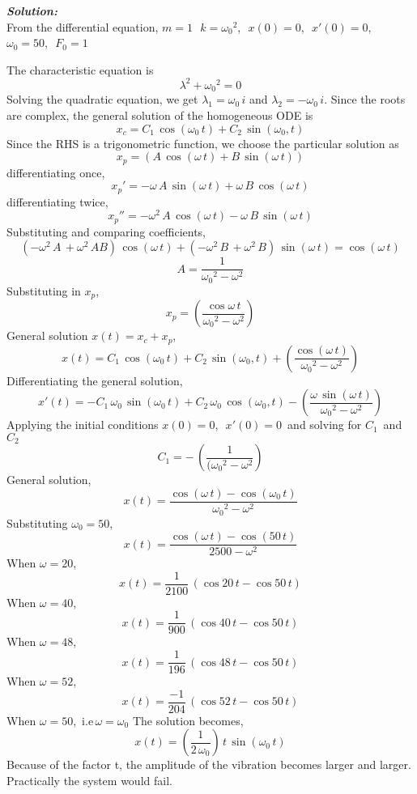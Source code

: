 \documentclass[]{book}
\theoremstyle{definition}
\begin{document}
\begin{enumerate}
\emph{\textbf{Solution:}}\\
From the differential equation,
$m = 1$\,\, $k = {\omega_0}^2$,\,\, ${x}(0) = 0$,\,\, ${x}'(0) = 0$,\,\, $\omega_0 = 50$,\,\, $F_0 = 1$

The characteristic equation is
\[\lambda^2 + {\omega_0}^2 = 0\]
Solving the quadratic equation, we get \(\lambda_1 = {\omega_0}\,i\) and \(\lambda_2 = -{\omega_0}\,i\).
Since the roots are complex, the general solution of the homogeneous ODE is
\[
x_c = C_1\,\cos({\omega_0}\,t) + C_2\,\sin({\omega_0},t)
\]
Since the RHS is a trigonometric function, we choose the particular solution as
\[
x_p = (A\,\cos(\omega\,t) + B\,\sin(\omega\,t))
\]
differentiating once,
\[
x_{p}'= -\omega\,A\,\sin(\omega\,t) + \omega\,B\,\cos(\omega\,t)
\]
differentiating twice,
\[
x_{p}''= -\omega^2\,A\,\cos{(\omega\,t)} - \omega\,B\,\sin{(\omega\,t)}
\]
Substituting and comparing coefficients,
\[
(-\omega^2\,A\, + \omega^2\,AB)\,\cos{(\omega\,t)} + (-\omega^2\,B\, + \omega^2\,B)\,\sin{(\omega\,t)} = \cos{(\omega\,t)}
\]
\[
A = \frac{1}{{\omega_0}^2 - {\omega^2}}
\]
Substituting in $x_p$,
\[
x_p = (\frac{\cos{\omega\,t}}{{\omega_0}^2 - {\omega^2}})
\]
General solution ${x}(t) = {x_c} + {x_p}$,
\[
{x}(t) = C_1\,\cos({\omega_0}\,t) + C_2\,\sin({\omega_0},t) +  (\frac{\cos({\omega\,t})}{{\omega_0}^2 - {\omega^2}})
\]
Differentiating the general solution,
\[
{x}'(t) = -C_1\,\omega_0\,\sin({\omega_0}\,t) + C_2\,\omega_0\,\cos({\omega_0},t) -  (\frac{\omega\,\sin({\omega\,t})}{{\omega_0}^2 - {\omega^2}})
\]
Applying the initial conditions ${x}(0) = 0$,\,\, ${x}'(0) = 0$\, and solving for $C_1$\, and\, $C_2$
\[
C_1 = -\,(\frac{1}{({\omega_0}^2 - {\omega^2}})
\]
General solution,
\[
{x}(t) = \frac{\cos{(\omega\,t)} - \cos{(\omega_0\,t)} }{{\omega_0}^2 - {\omega^2}}
\]
Substituting $\omega_0 = 50$,
\[
{x}(t) = \frac{\cos{(\omega\,t)} - \cos{(50\,t)} }{2500 - {\omega^2}}
\]
When $\omega = 20$,
\[
{x}(t) = \frac{1}{2100}\,(\cos{20\,t} - \cos{50\,t})
\]
When $\omega = 40$,
\[
{x}(t) = \frac{1}{900}\,(\cos{40\,t} - \cos{50\,t})
\]
When $\omega = 48$,
\[
{x}(t) = \frac{1}{196}\,(\cos{48\,t} - \cos{50\,t})
\]
When $\omega = 52$,
\[
{x}(t) = \frac{-1}{204}\,(\cos{52\,t} - \cos{50\,t})
\]
When $\omega = 50$,\, i.e\,$\omega = \omega_0$ The solution becomes, 
\[
{x}(t) = (\frac{1}{2\,\omega_0})\,t\,\sin{(\omega_0\,t)}
\]
Because of the factor t, the amplitude of the vibration becomes larger and larger. Practically the system would fail.


\end{enumerate}
\end{document}
